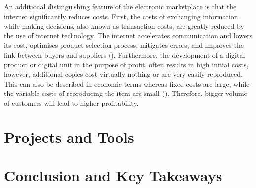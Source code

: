 \documentclass[11pt,a4paper]{article}
\begin{document}
{An additional distinguishing feature of the electronic marketplace is that the internet significantly reduces costs. First, the costs of exchanging information while making decisions, also known as transaction costs, are greatly reduced by the use of internet technology. The internet accelerates communication and lowers its cost, optimises product selection process, mitigates errors, and improves the link between buyers and suppliers (\cite{bunduchiBusinessRelationshipsInternetbased2005}). Furthermore, the development of a digital product or digital unit in the purpose of profit, often results in high initial costs, however, additional copies cost virtually nothing or are very easily reproduced. This can also be described in economic terms whereas fixed costs are large, while the variable costs of reproducing the item are small (\cite{shapiroInformationRulesStrategic1998a}). Therefore, bigger volume of customers will lead to higher profitability.



\section{Projects and Tools}
\label{project_tools}


\newpage

\section{Conclusion and Key Takeaways}
\label{conclusion}


\newpage

 
\pagebreak


\nocite{mccarthyAmericansTrustTech}
\printbibliography




}
\end{document}
